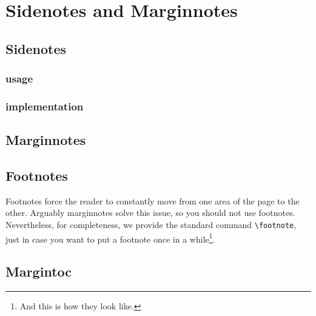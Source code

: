 \renewcommand*{\chapterformat}
{
  \enskip\mbox{\scalebox{4}{\thechapter\autodot}}
}
\renewcommand\chapterlinesformat[3]
{
  \parbox[b]{\textwidth+\marginparsep+\marginparwidth}{\hrulefill#2}\par%
  #3%
}
\setchapterpreamble[u]{\margintoc}
\chapter{Sidenotes and Marginnotes}

\section{Sidenotes}

\subsection{usage}

\subsection{implementation}

\section{Marginnotes}

\section{Footnotes}

Footnotes force the reader to constantly move from one area of the page 
to the other. Arguably marginnotes solve this issue, so you should not 
use footnotes. Nevertheless, for completeness, we provide the standard 
command \verb|\footnote|, just in case you want to put a footnote once 
in a while\footnote{And this is how they look like.}.

\section{Margintoc}

